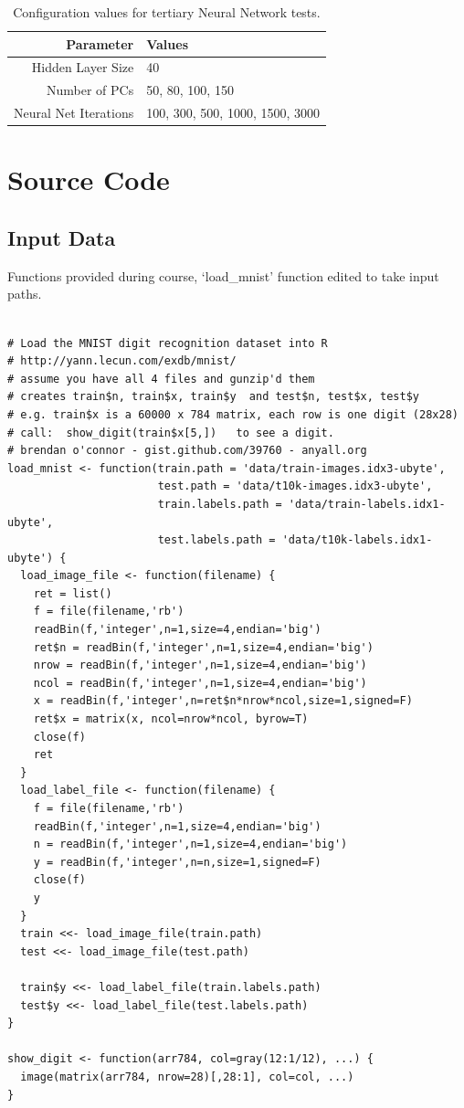 \documentclass[11pt]{article} %
\begin{document}
\begin{table}[h!]
\begin{center}
\begin{tabular}{rl}
Parameter & Values \\
\hline
Hidden Layer Size & 40\\
Number of PCs & 50, 80, 100, 150\\
Neural Net Iterations & 100, 300, 500, 1000, 1500, 3000\\
\hline
\end{tabular}
\caption{Configuration values for tertiary Neural Network tests.}
\label{nnet_parameters_third}
\end{center}
\end{table}



\section{Source Code}

\subsection{Input Data}

Functions provided during course, `load\_mnist' function edited to take input paths. 
\begin{lstlisting}

# Load the MNIST digit recognition dataset into R
# http://yann.lecun.com/exdb/mnist/
# assume you have all 4 files and gunzip'd them
# creates train$n, train$x, train$y  and test$n, test$x, test$y
# e.g. train$x is a 60000 x 784 matrix, each row is one digit (28x28)
# call:  show_digit(train$x[5,])   to see a digit.
# brendan o'connor - gist.github.com/39760 - anyall.org
load_mnist <- function(train.path = 'data/train-images.idx3-ubyte',
                       test.path = 'data/t10k-images.idx3-ubyte',
                       train.labels.path = 'data/train-labels.idx1-ubyte',
                       test.labels.path = 'data/t10k-labels.idx1-ubyte') {
  load_image_file <- function(filename) {
    ret = list()
    f = file(filename,'rb')
    readBin(f,'integer',n=1,size=4,endian='big')
    ret$n = readBin(f,'integer',n=1,size=4,endian='big')
    nrow = readBin(f,'integer',n=1,size=4,endian='big')
    ncol = readBin(f,'integer',n=1,size=4,endian='big')
    x = readBin(f,'integer',n=ret$n*nrow*ncol,size=1,signed=F)
    ret$x = matrix(x, ncol=nrow*ncol, byrow=T)
    close(f)
    ret
  }
  load_label_file <- function(filename) {
    f = file(filename,'rb')
    readBin(f,'integer',n=1,size=4,endian='big')
    n = readBin(f,'integer',n=1,size=4,endian='big')
    y = readBin(f,'integer',n=n,size=1,signed=F)
    close(f)
    y
  }
  train <<- load_image_file(train.path)
  test <<- load_image_file(test.path)
  
  train$y <<- load_label_file(train.labels.path)
  test$y <<- load_label_file(test.labels.path)  
}

show_digit <- function(arr784, col=gray(12:1/12), ...) {
  image(matrix(arr784, nrow=28)[,28:1], col=col, ...)
}

\end{lstlisting}
\end{document}
